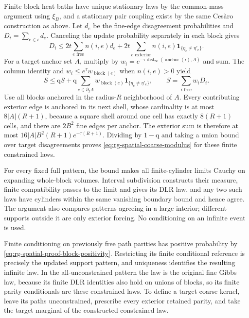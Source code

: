 Finite block heat baths have unique stationary laws by the common-mass
argument using \(\xi_B\), and a stationary pair coupling exists by the same
Ces\`aro construction as above. Let \(d_e\) be the fine-edge disagreement
probabilities and \(D_i=\sum_{e\in i}d_e\). Canceling the update probability
separately in each block gives
\begin{equation}
 D_i\le2t\sum_{e\text{ free}}n(i,e)d_e
      +2t\sum_{e\text{ exterior}}n(i,e)
                         \mathbf1_{\{\eta_e\ne\eta'_e\}}.
 \label{eq:rg-spatial-proof-block-hamming}
\end{equation}
For a target anchor set \(A\), multiply by
\(w_i=e^{-\tau\operatorname{dist}_\infty(\operatorname{anchor}(i),A)}\) and
sum. The column identity and \(w_i\le e^\tau w_{\operatorname{block}(e)}\)
when \(n(i,e)>0\) yield
\begin{equation}
 S\le\mathrm qS+\mathrm q\sum_{e\in\partial_f\Lambda}w_{\operatorname{block}(e)}
                          \mathbf1_{\{\eta_e\ne\eta'_e\}},\qquad
 S=\sum_{i\text{ free}}w_iD_i.
 \label{eq:rg-spatial-proof-weighted-column}
\end{equation}
Use all blocks anchored in the radius-\(R\) neighborhood of \(A\). Every
contributing exterior edge is anchored in its next shell, whose cardinality
is at most \(8|A|(R+1)\), because a square shell around one cell has exactly
\(8(R+1)\) cells, and there are \(2B^2\) fine edges per anchor. The exterior
sum is therefore at most \(16|A|B^2(R+1)e^{-\tau(R+1)}\). Dividing by
\(1-\mathrm q\) and taking a union bound over target disagreements proves
\cref{eq:rg-spatial-coarse-modulus} for these finite constrained laws.

For every fixed full pattern, the bound makes all finite-cylinder limits
Cauchy on expanding whole-block volumes. Interval subdivision constructs
their measure, finite compatibility passes to the limit and gives its DLR
law, and any two such laws have cylinders within the same vanishing
boundary bound and hence agree. The argument also compares patterns
agreeing in a large interior; different supports outside it are only
exterior forcing. No conditioning on an infinite event is used.

Finite conditioning on previously free path parities has positive
probability by \cref{eq:rg-spatial-proof-block-positivity}. Restricting its
finite conditional reference is precisely the updated support pattern, and
uniqueness identifies the resulting infinite law. In the all-unconstrained
pattern the law is the original fine Gibbs law, because its finite DLR
identities also hold on unions of blocks, so its finite parity conditionals
are these constrained laws. To define a target coarse kernel, leave its
paths unconstrained, prescribe every exterior retained parity, and take the
target marginal of the constructed constrained law.

